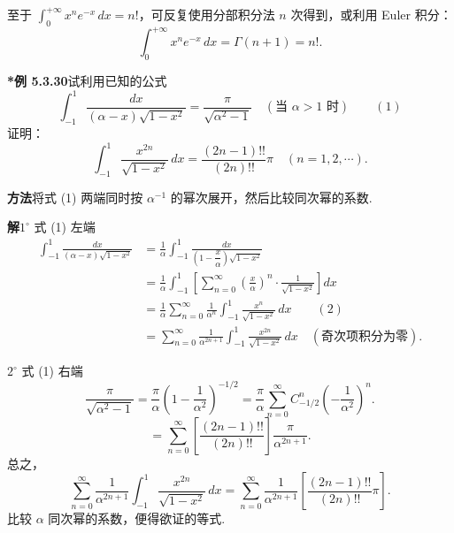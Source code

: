 \documentclass[UTF8, 12pt, fontset=fandol, oneside]{ctexart}
\begin{document}
至于 $\displaystyle\int_0^{+\infty}x^ne^{-x}\,dx=n!$，可反复使用分部积分法 $n$ 次得到，或利用 Euler 积分：
\[
  \int_0^{+\infty}x^ne^{-x}\,dx=\Gamma(n+1)=n!.
\]

\noindent\textbf{*例 5.3.30}\quad 试利用已知的公式
\[
  \int_{-1}^1\frac{dx}{(\alpha-x)\sqrt{1-x^2}}=\frac{\pi}{\sqrt{\alpha^2-1}}
  \quad(\text{当 }\alpha>1\text{ 时}) \qquad(1)
\]
证明：
\[
  \int_{-1}^1\frac{x^{2n}}{\sqrt{1-x^2}}\,dx
  =\frac{(2n-1)!!}{(2n)!!}\pi\quad(n=1,2,\cdots).
\]

\noindent\textbf{方法}\quad 将式 (1) 两端同时按 $\alpha^{-1}$ 的幂次展开，然后比较同次幂的系数.

\noindent\textbf{解}\quad $1^\circ$ 式 (1) 左端
\[
\begin{aligned}
\int_{-1}^1\frac{dx}{(\alpha-x)\sqrt{1-x^2}}
&=\frac1\alpha\int_{-1}^1\frac{dx}{\left(1-\dfrac{x}{\alpha}\right)\sqrt{1-x^2}}\\
&=\frac1\alpha\int_{-1}^1\left[\sum_{n=0}^{\infty}\left(\frac{x}{\alpha}\right)^n\cdot\frac1{\sqrt{1-x^2}}\right]dx\\
&=\frac1\alpha\sum_{n=0}^{\infty}\frac1{\alpha^n}\int_{-1}^1\frac{x^n}{\sqrt{1-x^2}}\,dx\qquad(2)\\
&=\sum_{n=0}^{\infty}\frac1{\alpha^{2n+1}}\int_{-1}^1\frac{x^{2n}}{\sqrt{1-x^2}}\,dx\quad(\text{奇次项积分为零}).
\end{aligned}
\]

$2^\circ$ 式 (1) 右端
\[
  \frac{\pi}{\sqrt{\alpha^2-1}}
  =\frac{\pi}{\alpha}\left(1-\frac1{\alpha^2}\right)^{-1/2}
  =\frac{\pi}{\alpha}\sum_{n=0}^{\infty}C_{-1/2}^n\left(-\frac1{\alpha^2}\right)^n.
\]
\[
  =\sum_{n=0}^{\infty}\left[\frac{(2n-1)!!}{(2n)!!}\right]\frac{\pi}{\alpha^{2n+1}}.
\]
总之，
\[
  \sum_{n=0}^{\infty}\frac1{\alpha^{2n+1}}\int_{-1}^1\frac{x^{2n}}{\sqrt{1-x^2}}\,dx
  =\sum_{n=0}^{\infty}\frac1{\alpha^{2n+1}}\left[\frac{(2n-1)!!}{(2n)!!}\pi\right].
\]
比较 $\alpha$ 同次幂的系数，便得欲证的等式.
\end{document}
